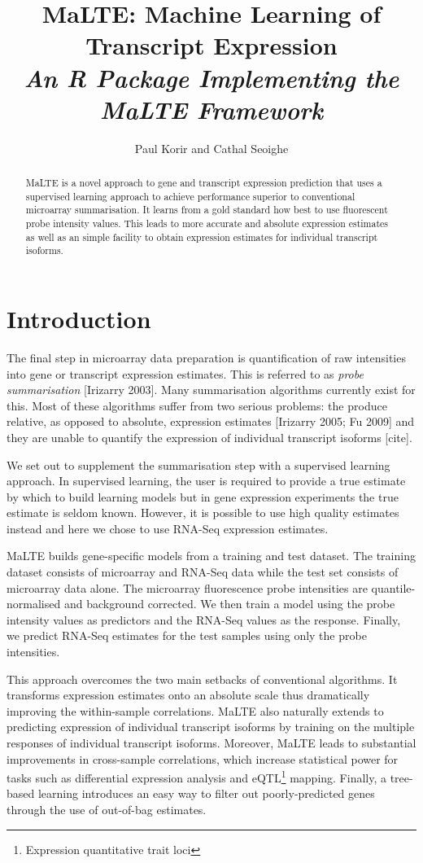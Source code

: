 \documentclass[a4paper,12pt]{article}
\author{Paul Korir and Cathal Seoighe}
\title{\textbf{MaLTE: Machine Learning of Transcript Expression}\\\textit{An R Package Implementing the MaLTE Framework}}
\date{}
\begin{document}
\maketitle
\tableofcontents

\begin{abstract}
MaLTE is a novel approach to gene and transcript expression prediction that uses a supervised learning approach to achieve performance superior to conventional microarray summarisation. It learns from a gold standard how best to use fluorescent probe intensity values. This leads to more accurate and absolute expression estimates as well as an simple facility to obtain expression estimates for individual transcript isoforms.
\end{abstract}

\section{Introduction}
The final step in microarray data preparation is quantification of raw intensities into gene or transcript expression estimates. This is referred to as \textit{probe summarisation} [Irizarry 2003]. Many summarisation algorithms currently exist for this. Most of these algorithms suffer from two serious problems: the produce relative, as opposed to absolute, expression estimates [Irizarry 2005; Fu 2009] and they are unable to quantify the expression of individual transcript isoforms [cite].

We set out to supplement the summarisation step with a supervised learning approach. In supervised learning, the user is required to provide a true estimate by which to build learning models but in gene expression experiments the true estimate is seldom known. However, it is possible to use high quality estimates instead and here we chose to use RNA-Seq expression estimates.

MaLTE builds gene-specific models from a training and test dataset. The training dataset consists of microarray and RNA-Seq data while the test set consists of microarray data alone. The microarray fluorescence probe intensities are quantile-normalised and background corrected. We then train a model using the probe intensity values as predictors and the RNA-Seq values as the response. Finally, we predict RNA-Seq estimates for the test samples using only the probe intensities.

This approach overcomes the two main setbacks of conventional algorithms. It transforms expression estimates onto an absolute scale thus dramatically improving the within-sample correlations. MaLTE also naturally extends to predicting expression of individual transcript isoforms by training on the multiple responses of individual transcript isoforms. Moreover, MaLTE leads to substantial improvements in cross-sample correlations, which increase statistical power for tasks such as differential expression analysis and eQTL\footnote{Expression quantitative trait loci} mapping. Finally, a tree-based learning introduces an easy way to filter out poorly-predicted genes through the use of out-of-bag estimates.
\end{document}
